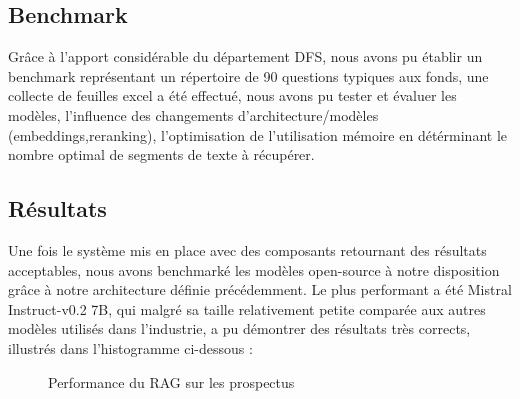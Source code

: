 \documentclass[13pt,a4paper]{article}
\begin{document}
\subsection{Benchmark}
Grâce à l'apport considérable du département DFS, nous avons pu établir un benchmark représentant un répertoire de 90 questions typiques aux fonds, une collecte de feuilles excel a été effectué, nous avons pu tester et évaluer les modèles, l'influence des changements d'architecture/modèles (embeddings,reranking), l'optimisation de l'utilisation mémoire en détérminant le nombre optimal de segments de texte à récupérer.


\subsection{Résultats}

Une fois le système mis en place avec des composants retournant des résultats acceptables, nous avons benchmarké les modèles open-source à notre disposition grâce à notre architecture définie précédemment. Le plus performant a été Mistral Instruct-v0.2 7B, qui malgré sa taille relativement petite comparée aux autres modèles utilisés dans l'industrie, a pu démontrer des résultats très corrects, illustrés dans l'histogramme ci-dessous :

\begin{figure}[h]
    \centering
{}
    \caption{Performance du RAG sur les prospectus}
    \label{fig:mesh2}
\end{figure}
\end{document}
